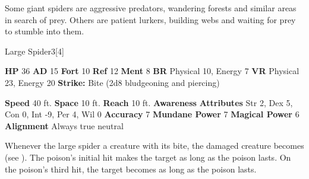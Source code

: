       Some giant spiders are aggressive predators, wandering forests and similar areas in search of prey.
      Others are patient lurkers, building webs and waiting for prey to stumble into them.
    

      
  \begin{monsubsection}{Large Spider}{3}[4]
    \vspace{-1em}\vspace{-1em}
    \vspace{0em}

    
    

    \begin{spellcontent}
      \begin{spelltargetinginfo}
        \pari \textbf{HP} 36 \monsep
          \textbf{AD} 15 \monsep
          \textbf{Fort} 10 \monsep
          \textbf{Ref} 12 \monsep
          \textbf{Ment} 8
        \pari \textbf{BR} Physical 10, Energy 7 \monsep
        \textbf{VR} Physical 23, Energy 20
        \pari \textbf{Strike:}
            Bite  (2d8 bludgeoning and piercing)
      \end{spelltargetinginfo}
    \end{spellcontent}
    \begin{monsterfooter}
      \pari \textbf{Speed} 40 ft. \monsep
        \textbf{Space} 10 ft. \monsep
        \textbf{Reach} 10 ft.
      \pari \textbf{Awareness} 
      \pari \textbf{Attributes}
        Str 2, Dex 5,
        Con 0, Int -9,
        Per 4, Wil 0
      \pari \textbf{Accuracy} 7 \monsep
        \textbf{Mundane Power} 7 \monsep
      \textbf{Magical Power} 6
      \pari \textbf{Alignment} Always true neutral
    \end{monsterfooter}
  \end{monsubsection}
        Whenever the large spider  a creature with its bite,
          the damaged creature becomes  (see ).
        The poison's initial hit makes the target  as long as the poison lasts.
        On the poison's third hit, the target becomes  as long as the poison lasts.
  

